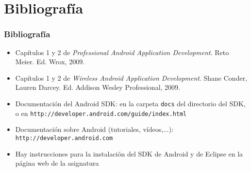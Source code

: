 \documentclass[hyperref={pdfpagelabels=true},utf8x]{beamer}
\newcommand{\dif}{\textsl}
\begin{document}








\section{Bibliografía}

\begin{frame}[fragile]
\frametitle{Bibliografía}

\begin{itemize}
\item Capítulos 1 y 2 de \dif{Professional Android Application
  Development}. Reto Meier. Ed. Wrox, 2009.
\item Capítulos 1 y 2 de \dif{Wireless Android Application
  Development}. Shane Conder, Lauren Darcey. Ed. Addison Wesley
  Professional, 2009.
\item Documentación del Android SDK: en la carpeta \verb|docs| del
  directorio del SDK, o en
  \verb|http://developer.android.com/guide/index.html|
\item Documentación sobre Android (tutoriales, vídeos,...): 
  \verb|http://developer.android.com|
\item Hay instrucciones para la instalación del SDK de Android y de
  Eclipse en la página web de la asignatura
\end{itemize}
\end{frame}
\end{document}
